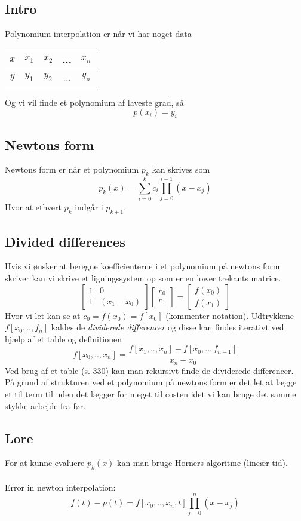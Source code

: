 \documentclass[11pt,a4paper]{article}
\begin{document}
\subsection*{Intro}
Polynomium interpolation er når vi har noget data\\
\begin{center}
\begin{tabular}{|c||c|c|c|c|}
\hline 
$x$ & $x_1$ & $x_2$ & ... & $x_n$ \\ 
\hline 
$y$ & $y_1$ & $y_2$ & ... & $y_n$ \\ 
\hline 
\end{tabular}
\end{center}
Og vi vil finde et polynomium af laveste grad, så
$$p(x_i)=y_i$$

\subsection*{Newtons form}
Newtons form er når et polynomium $p_k$ kan skrives som
$$p_k(x)=\sum_{i=0}^k c_i \prod_{j=0}^{i-1} (x-x_j)$$
Hvor at ethvert $p_k$ indgår i $p_{k+1}$.

\subsection*{Divided differences}
Hvis vi ønsker at beregne koefficienterne i et polynomium på newtons form skriver kan vi skrive et ligningssystem op som er en lower trekants matrice.
$$
\begin{bmatrix}
1 & 0 \\
1 & (x_1-x_0)
\end{bmatrix}
\begin{bmatrix}
c_0 \\
c_1
\end{bmatrix}
=
\begin{bmatrix}
f(x_0) \\
f(x_1)
\end{bmatrix}
$$
Hvor vi let kan se at $c_0=f(x_0)=f[x_0]$ (kommenter notation). Udtrykkene $f[x_0,..,f_n]$ kaldes de \textit{dividerede differencer} og disse kan findes iterativt ved hjælp af et table og definitionen
$$
f[x_0,..,x_n]=\frac{f[x_1,..,x_n]-f[x_0,..,f_{n-1}]}{x_n-x_0}
$$
Ved brug af et table (s. 330) kan man rekursivt finde de dividerede differencer. På grund af strukturen ved et polynomium på newtons form er det let at lægge et til term til uden det lægger for meget til costen idet vi kan bruge det samme stykke arbejde fra før.

\subsection*{Lore}
For at kunne evaluere $p_k(x)$ kan man bruge Horners algoritme (lineær tid).\\
\\
Error in newton interpolation:
$$
f(t)-p(t)=f[x_0,..,x_n,t]\prod_{j=0}^n (x-x_j)
$$
\end{document}
